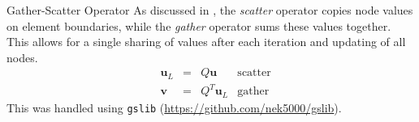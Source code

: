 \begin{frame}{Gather-Scatter Operator}
  As discussed in \cite{devilleHighorderMethodsIncompressible2002}, the \textit{scatter} operator copies node values on element boundaries, while the \textit{gather} operator sums these values together.
  This allows for a single sharing of values after each iteration and updating of all nodes.
  \begin{equation}
    \begin{aligned}
       & \mathbf{u}_L & = & Q\mathbf{u}     & \text{scatter} \\
       & \mathbf{v}   & = & Q^T\mathbf{u}_L & \text{gather}
    \end{aligned}
  \end{equation}
  This was handled using \texttt{gslib} (\url{https://github.com/nek5000/gslib}).
\end{frame}